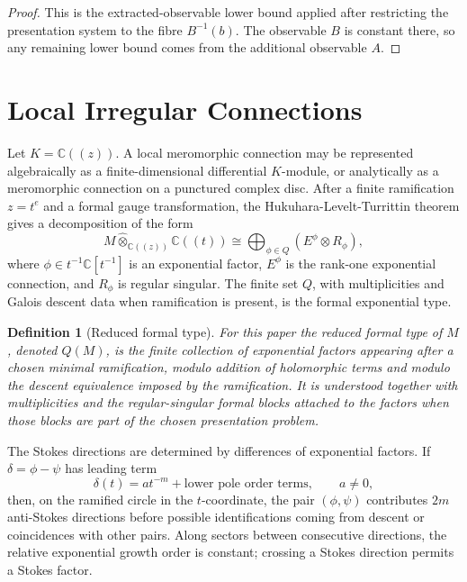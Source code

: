 \documentclass[11pt]{article}
\newtheorem{definition}[theorem]{Definition}
\begin{document}
\begin{proof}
This is the extracted-observable lower bound applied after restricting the presentation system to the fibre \(B^{-1}(b)\).  The observable \(B\) is constant there, so any remaining lower bound comes from the additional observable \(A\).
\end{proof}

\section{Local Irregular Connections}

Let \(K=\mathbb C((z))\).  A local meromorphic connection may be represented algebraically as a finite-dimensional differential \(K\)-module, or analytically as a meromorphic connection on a punctured complex disc.  After a finite ramification \(z=t^e\) and a formal gauge transformation, the Hukuhara-Levelt-Turrittin theorem gives a decomposition of the form
\[
M\widehat{\otimes}_{\mathbb C((z))}\mathbb C((t))
\cong
\bigoplus_{\phi\in Q}
\left(E^{\phi}\otimes R_{\phi}\right),
\]
where \(\phi\in t^{-1}\mathbb C[t^{-1}]\) is an exponential factor, \(E^{\phi}\) is the rank-one exponential connection, and \(R_{\phi}\) is regular singular.  The finite set \(Q\), with multiplicities and Galois descent data when ramification is present, is the formal exponential type.

\begin{definition}[Reduced formal type]
For this paper the reduced formal type of \(M\), denoted \(Q(M)\), is the finite collection of exponential factors appearing after a chosen minimal ramification, modulo addition of holomorphic terms and modulo the descent equivalence imposed by the ramification.  It is understood together with multiplicities and the regular-singular formal blocks attached to the factors when those blocks are part of the chosen presentation problem.
\end{definition}

The Stokes directions are determined by differences of exponential factors.  If \(\delta=\phi-\psi\) has leading term
\[
\delta(t)=a t^{-m}+\text{lower pole order terms},\qquad a\ne0,
\]
then, on the ramified circle in the \(t\)-coordinate, the pair \((\phi,\psi)\) contributes \(2m\) anti-Stokes directions before possible identifications coming from descent or coincidences with other pairs.  Along sectors between consecutive directions, the relative exponential growth order is constant; crossing a Stokes direction permits a Stokes factor.
\end{document}
